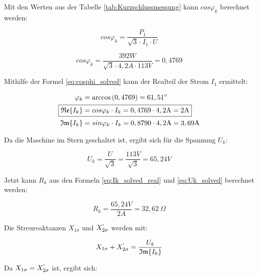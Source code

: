 \documentclass[conference]{IEEEtran}
\begin{document}
Mit den Werten aus der Tabelle \ref{tab:Kurzschlussmessung} kann $cos\varphi_k$ berechnet werden:

\begin{equation}
    \boxed{cos\varphi_k = \frac{P_1}{\sqrt{3} \cdot I_1 \cdot U}}
\end{equation}

\begin{equation} \label{eq:cosphi_solved}
    cos\varphi_k = \frac{392 \si{W}}{\sqrt{3} \cdot 4,2 \si{A} \cdot 113 \si{V}} = 0,4769
\end{equation}

Mithilfe der Formel \ref{eq:cosphi_solved} kann der Realteil der Strom $I_1$ ermittelt:

\begin{align} \label{eq:Ik_solved_real}
    \varphi_k                    & = \arccos\left(0,4769\right) = 61,51^\circ                       \\
    \Aboxed{\mathfrak{Re}\{I_k\} & = cos\varphi_k \cdot I_k = 0,4769 \cdot 4,2 \si{A} = 2\si{A}}    \\
    \mathfrak{Im}\{I_k\}         & = sin\varphi_k \cdot I_k = 0,8790 \cdot 4,2 \si{A} = 3,69 \si{A}
\end{align}

Da die Maschine im Stern geschaltet ist, ergibt sich für die Spannung $U_k$:

\begin{equation} \label{eq:Uk_solved}
    \boxed{U_k = \frac{U}{\sqrt{3}}} = \frac{113 \si{V}}{\sqrt{3}} = 65,24 \si{V}
\end{equation}

Jetzt kann $R_k$ aus den Formeln \ref{eq:Ik_solved_real} und \ref{eq:Uk_solved} berechnet werden:

\begin{equation} \label{eq:Kurzschlusswiderstand_calc}
    \boxed{R_k = \frac{65,24\si{V}}{2\si{A}} = \underline{32,62\ \Omega}}
\end{equation}

Die Streureaktanzen $X_{1\sigma}$ und $X_{2\sigma}^\text{\textquotesingle}$ werden mit:

\begin{equation} \label{eq:Streureaktanzen}
    X_{1\sigma} + X_{2\sigma}^\text{\textquotesingle} = \frac{U_k}{\mathfrak{Im}\{I_k\}}
\end{equation}

Da $X_{1\sigma} = X_{2\sigma}^\text{\textquotesingle}$ ist, ergibt sich:
\end{document}
